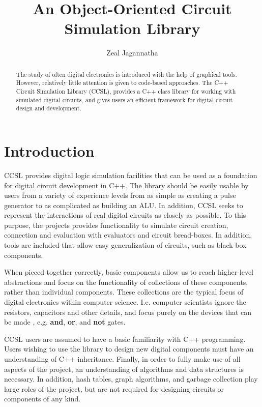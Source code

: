 \documentclass{article}
\newcommand{\Bold}[1]{\textbf{#1}}
\begin{document}

\title{An Object-Oriented Circuit Simulation Library}
\author{Zeal Jagannatha}

\maketitle

\begin{abstract}

The study of often digital electronics is introduced with the help of graphical tools. However, relatively little attention is given to code-based approaches. The C++ Circuit Simulation Library (CCSL), provides a C++ class library for working with simulated digital circuits, and gives users an efficient framework for digital circuit design and development.

\end{abstract}

\section{Introduction}

CCSL provides digital logic simulation facilities that can be used as a foundation for digital circuit development in C++. The library should be easily usable by users from a variety of experience levels from as simple as creating a pulse generator to as complicated as building an ALU. In addition, CCSL seeks to represent the interactions of real digital circuits as closely as possible. To this purpose, the projects provides functionality to simulate circuit creation, connection and evaluation with evaluators and circuit bread-boxes. In addition, tools are included that allow easy generalization of circuits, such as black-box components.

When pieced together correctly, basic components allow us to reach higher-level abstractions and focus on the functionality of collections of these components, rather than individual components. These collections are the typical focus of digital electronics within computer science. I.e. computer scientists ignore the resistors, capacitors and other details, and focus purely on the devices that can be made , e.g. \Bold{and}, \Bold{or}, and \Bold{not} gates.

CCSL users are assumed to have a basic familiarity with C++ programming. Users wishing to use the library to design new digital components must have an understanding of C++ inheritance\cite{Stroustrup-2000}. Finally, in order to fully make use of all aspects of the project, an understanding of algorithms and data structures is necessary. In addition, hash tables, graph algorithms, and garbage collection play large roles of the project, but are not required for designing circuits or components of any kind.
\end{document}
